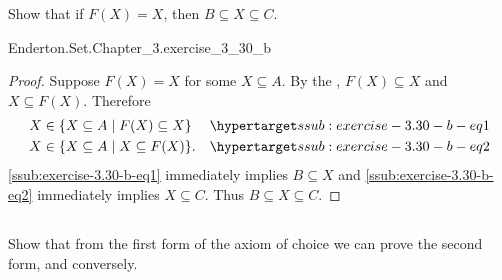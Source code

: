 \documentclass{report}
\begin{document}
\subsubsection{}%

  Show that if $F(X) = X$, then $B \subseteq X \subseteq C$.

    {Enderton.Set.Chapter\_3.exercise\_3\_30\_b}

  \begin{proof}
    Suppose $F(X) = X$ for some $X \subseteq A$.
    By the , $F(X) \subseteq X$ and
      $X \subseteq F(X)$.
    Therefore
      \begin{align}
        X & \in \{X \subseteq A \mid F(X) \subseteq X\}
          & \hyperlabel{ssub:exercise-3.30-b-eq1} \\
        X & \in \{X \subseteq A \mid X \subseteq F(X)\}.
          & \hyperlabel{ssub:exercise-3.30-b-eq2}
      \end{align}
    \eqref{ssub:exercise-3.30-b-eq1} immediately implies $B \subseteq X$ and
      \eqref{ssub:exercise-3.30-b-eq2} immediately implies $X \subseteq C$.
    Thus $B \subseteq X \subseteq C$.
  \end{proof}

\subsection{}%

  Show that from the first form of the axiom of choice we can prove the second
    form, and conversely.
\end{document}
